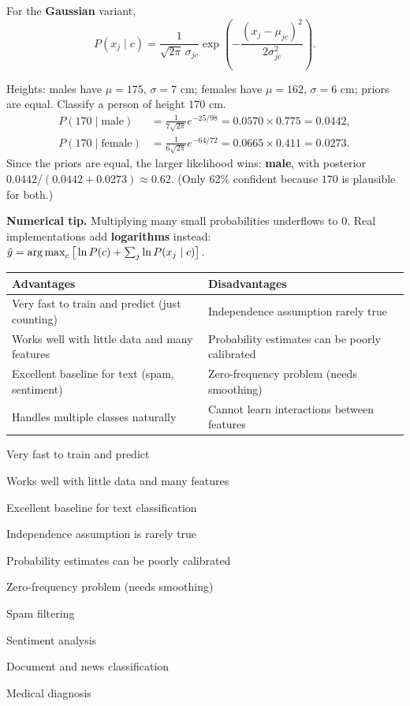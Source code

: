 For the \textbf{Gaussian} variant,
\[
  P(x_j\mid c)=\frac{1}{\sqrt{2\pi}\,\sigma_{jc}}\exp\!\left(-\frac{(x_j-\mu_{jc})^2}{2\sigma_{jc}^2}\right).
\]

\begin{example}
Heights: males have $\mu=175$, $\sigma=7$ cm; females have $\mu=162$, $\sigma=6$ cm; priors are equal. Classify a person of height $170$ cm.
\begin{align*}
P(170\mid\text{male})&=\tfrac{1}{7\sqrt{2\pi}}e^{-25/98}=0.0570\times0.775=0.0442,\\
P(170\mid\text{female})&=\tfrac{1}{6\sqrt{2\pi}}e^{-64/72}=0.0665\times0.411=0.0273.
\end{align*}
Since the priors are equal, the larger likelihood wins: \textbf{male}, with posterior $0.0442/(0.0442+0.0273)\approx0.62$. (Only 62\% confident because $170$ is plausible for both.)
\end{example}

\begin{keyidea}
\textbf{Numerical tip.} Multiplying many small probabilities underflows to $0$. Real implementations add \textbf{logarithms} instead: $\hat y=\operatorname*{arg\,max}_c\big[\ln P(c)+\sum_j\ln P(x_j\mid c)\big]$.
\end{keyidea}

\begin{center}
\begin{tabular}{@{}p{6.7cm}p{6.7cm}@{}}
\toprule
\textbf{Advantages} & \textbf{Disadvantages}\\
\midrule
Very fast to train and predict (just counting) & Independence assumption rarely true\\
Works well with little data and many features & Probability estimates can be poorly calibrated\\
Excellent baseline for text (spam, sentiment) & Zero-frequency problem (needs smoothing)\\
Handles multiple classes naturally & Cannot learn interactions between features\\
\bottomrule
\end{tabular}
\end{center}

{\item Very fast to train and predict
 \item Works well with little data and many features
 \item Excellent baseline for text classification}
{\item Independence assumption is rarely true
 \item Probability estimates can be poorly calibrated
 \item Zero-frequency problem (needs smoothing)}
{\item Spam filtering
 \item Sentiment analysis
 \item Document and news classification
 \item Medical diagnosis}

